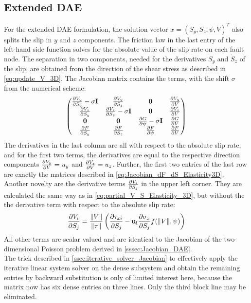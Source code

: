 \subsection{Extended DAE}
For the extended DAE formulation, the solution vector $x = (S_y, S_z, \psi, V)^T$ also splits the slip in $y$ and $z$ components. The friction law in the last entry of the left-hand side function solves for the absolute value of the slip rate on each fault node. The separation in two components, needed for the derivatives $\dot{S}_y$ and $\dot{S}_z$ of the slip, are obtained from the direction of the shear stress as described in \autoref{eq:update_V_3D}. The Jacobian matrix contains the terms, with the shift $\sigma$ from the numerical scheme:
\begin{equation}
	\begin{pmatrix}
		\pdv{V_y}{S_y}-\sigma\mathbf{I} & \pdv{V_y}{S_z}                  & \mathbf{0}                      & \pdv{V_y}{V} \\
		\pdv{V_z}{S_y}                  & \pdv{V_z}{S_z}-\sigma\mathbf{I} & \mathbf{0}                      & \pdv{V_z}{V} \\ 
		\mathbf{0}                      & \mathbf{0}                      & \pdv{G}{\psi} -\sigma\mathbf{I} & \pdv{G}{V}   \\
		\pdv{F}{S_y}                    & \pdv{F}{S_z}                    & \pdv{F}{\psi}                   & \pdv{F}{V}
 	\end{pmatrix}
\end{equation}
The derivatives in the last column are all with respect to the absolute slip rate, and for the first two terms,  the derivatives are equal to the respective direction components $\pdv{V_y}{V} = u_y$ and $\pdv{V_z}{V} = u_z$. Further, the first two entries of the last row are exactly the matrices described in \autoref{eq:Jacobian_dF_dS_Elasticity3D}. Another novelty are the derivative terms $\pdv{V_i}{S_j}$ in the upper left corner. They are calculated the same way as in \autoref{eq:partial_V_S_Elasticity_3D}, but without the the derivative term with respect to the absolute slip rate:
\begin{equation}
	\pdv{V_i}{S_j} = \frac{\norm{V}}{\norm{\tau}}\left(\pdv{\tau_{xi}}{S_j} - \mathbf{u_i}\pdv{\sigma_x}{S_j}f(\norm{V}, \psi)\right)
\end{equation}
All other terms are scalar valued and are identical to the Jacobian of the two-dimensional Poisson problem derived in \autoref{sssec:Jacobian_DAE}. \\
The trick described in \autoref{ssec:iterative_solver_Jacobian} to effectively apply the iterative linear system solver on the dense subsystem and obtain the remaining entries by backward substitution is only of limited interest here, because the matrix now has six dense entries on three lines. Only the third block line may be eliminated.

